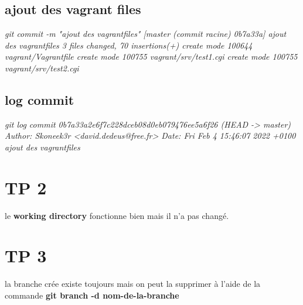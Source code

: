 \documentclass{report}
\begin{document}
\subsection{ajout des vagrant files}
\textit{git commit -m "ajout des vagrantfiles"
[master (commit racine) 0b7a33a] ajout des vagrantfiles
 3 files changed, 70 insertions(+)
 create mode 100644 vagrant/Vagrantfile
 create mode 100755 vagrant/srv/test1.cgi
 create mode 100755 vagrant/srv/test2.cgi}

\subsection{log commit}
\textit{git log commit 0b7a33a2e6f7c228dceb08d0eb079476ee5a6f26 (HEAD -> master)
Author: Skoneek3r <david.dedeus@free.fr>
Date:   Fri Feb 4 15:46:07 2022 +0100 ajout des vagrantfiles}

\section{TP 2}
le \textbf{working directory} fonctionne bien mais il n'a pas changé.

\section{TP 3}
la branche crée existe toujours mais on peut la supprimer à l'aide de la commande 
\textbf{git branch -d nom-de-la-branche}
\end{document}
